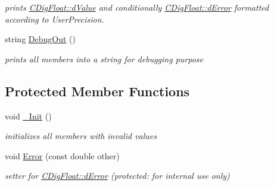 \begin{DoxyCompactItemize}
\begin{DoxyCompactList}\small\item\em prints \hyperlink{classCDigFloat_a4bbe69e30dd4e20527362493aa9aaf96}{C\+Dig\+Float\+::d\+Value} and conditionally \hyperlink{classCDigFloat_a25eb3782d1e727ff007a48f8308e3d4d}{C\+Dig\+Float\+::d\+Error} formatted according to User\+Precision. \end{DoxyCompactList}\item 
string \hyperlink{classCDigFloat_a006a43f81560e2429dce9aca7742a4e7}{Debug\+Out} ()
\begin{DoxyCompactList}\small\item\em prints all members into a string for debugging purpose \end{DoxyCompactList}\end{DoxyCompactItemize}
\subsection*{Protected Member Functions}
\begin{DoxyCompactItemize}
\item 
void \hyperlink{classCDigFloat_a89a0dda21c74c115ac41b432031666a6}{\+\_\+\+Init} ()
\begin{DoxyCompactList}\small\item\em initializes all members with invalid values \end{DoxyCompactList}\item 
void \hyperlink{classCDigFloat_a5fdd0d560073f5d06b41c7f66933635e}{Error} (const double other)
\begin{DoxyCompactList}\small\item\em setter for \hyperlink{classCDigFloat_a25eb3782d1e727ff007a48f8308e3d4d}{C\+Dig\+Float\+::d\+Error} (protected\+: for internal use only) \end{DoxyCompactList}\end{DoxyCompactItemize}
